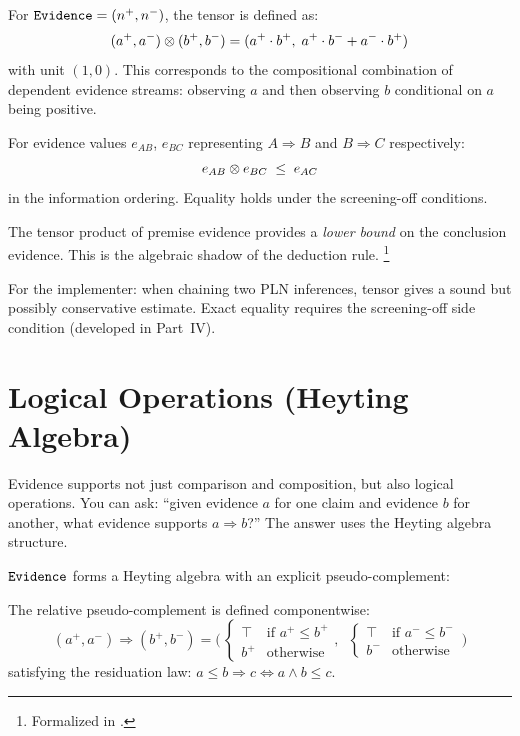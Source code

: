 \documentclass[11pt,openany]{report}
\begin{document}
For $\mathtt{Evidence} = (n^+, n^-)$, the tensor is defined as:
\[
  (a^+, a^-) \otimes (b^+, b^-) = (a^+ \cdot b^+,\; a^+ \cdot b^- + a^- \cdot b^+)
\]
with unit $(1, 0)$.  This corresponds to the compositional combination of
dependent evidence streams: observing $a$ and then observing $b$ conditional
on $a$ being positive.

\begin{theorem}
\label{thm:quantale-trans}
For evidence values $e_{AB}$, $e_{BC}$ representing
$A \Rightarrow B$ and $B \Rightarrow C$ respectively:
\[
  e_{AB} \otimes e_{BC} \;\le\; e_{AC}
\]
in the information ordering.  Equality holds under the screening-off
conditions.
\end{theorem}

\noindent
The tensor product of premise evidence provides a \emph{lower bound} on the
conclusion evidence.  This is the algebraic shadow of the deduction rule.%
\footnote{Formalized in .}

For the implementer: when chaining two PLN inferences, tensor gives a
sound but possibly conservative estimate.  Exact equality requires the
screening-off side condition (developed in Part~IV).

\section{Logical Operations (Heyting Algebra)}

Evidence supports not just comparison and composition, but also logical
operations.  You can ask: ``given evidence $a$ for one claim and evidence
$b$ for another, what evidence supports $a \Rightarrow b$?''  The answer
uses the Heyting algebra structure.

$\mathtt{Evidence}$ forms a Heyting algebra with an explicit
pseudo-complement:

\begin{definition}
The relative pseudo-complement is defined componentwise:
\[
  (a^+, a^-) \Rightarrow (b^+, b^-) =
  \Big(\,\begin{cases} \top & \text{if } a^+ \le b^+ \\
                        b^+ & \text{otherwise}\end{cases},\;\;
        \begin{cases} \top & \text{if } a^- \le b^- \\
                        b^- & \text{otherwise}\end{cases}\,\Big)
\]
satisfying the residuation law:
$a \le b \Rightarrow c \iff a \wedge b \le c$.
\end{definition}
\end{document}
